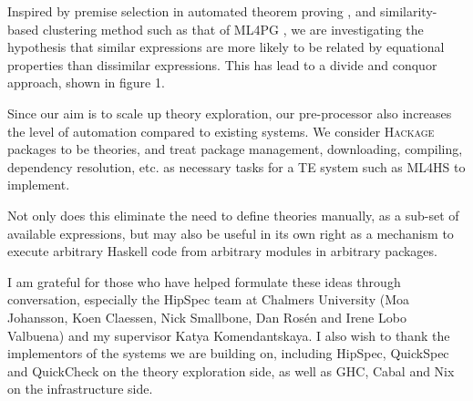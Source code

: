 \documentclass{eceasst}
\begin{document}
Inspired by premise selection in automated theorem proving
\cite{kuhlwein2012overview}, and similarity-based clustering method such as that
of \textsc{ML4PG} \cite{journals/corr/abs-1302-6421}, we are investigating the
hypothesis that similar expressions are more likely to be related by equational
properties than dissimilar expressions. This has lead to a divide and conquor
approach, shown in figure 1.

Since our aim is to scale up theory exploration, our pre-processor also
increases the level of automation compared to existing systems. We consider
\textsc{Hackage} packages to be theories, and treat package management,
downloading, compiling, dependency resolution, etc. as necessary tasks for a TE
system such as \textsc{ML4HS} to implement.

Not only does this eliminate the need to define theories manually, as a sub-set
of available expressions, but may also be useful in its own right as a mechanism
to execute arbitrary Haskell code from arbitrary modules in arbitrary packages.

\begin{acknowledge}
I am grateful for those who have helped formulate these ideas through
conversation, especially the HipSpec team at Chalmers University (Moa
Johansson, Koen Claessen, Nick Smallbone, Dan Ros{\'e}n and Irene Lobo Valbuena)
and my supervisor Katya Komendantskaya. I also wish to thank the implementors
of the systems we are building on, including HipSpec, QuickSpec and
QuickCheck on the theory exploration side, as well as GHC, Cabal and Nix
on the infrastructure side.
\end{acknowledge}



\end{document}
